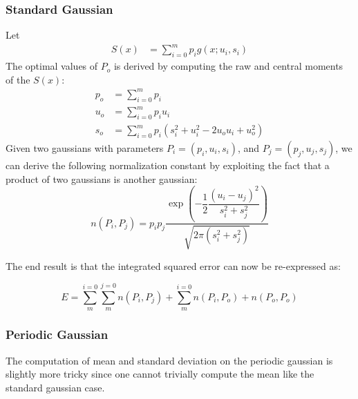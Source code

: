 \documentclass{acm_proc_article-sp}
\begin{document}
\subsubsection{Standard Gaussian}

Let
\begin{align}
S(x) &= \sum\limits^{m}_{i=0} p_i g(x; u_i, s_i)
\end{align}
The optimal values of $P_o$ is derived by computing the raw and central moments of the $S(x)$:
\begin{align*}
p_o &= \sum \limits^{m}_{i=0} p_i \\
u_o &= \sum \limits^{m}_{i=0} p_i u_i \\
s_o &= \sum \limits^{m}_{i=0} p_i (s_i^2+u_i^2-2 u_o u_i + u_o^2)
\end{align*}
Given two gaussians with parameters $P_i = (p_i, u_i, s_i)$, and $P_j = (p_j, u_j, s_j)$, we can derive the following normalization constant by exploiting the fact that a product of two gaussians is another gaussian:
\begin{equation}
n(P_i,P_j) = p_i p_j \dfrac{\exp\left(-\dfrac{1}{2} \dfrac{(u_i-u_j)^2}{s_i^2+s_j^2}\right)}{\sqrt{2\pi (s_i^2+s_j^2)}}
\end{equation}

The end result is that the integrated squared error can now be re-expressed as:

\begin{equation}
E = \sum \limits^{i=0}_{m} \sum \limits^{j=0}_{m} n(P_i, P_j) + \sum \limits^{i=0}_{m} n(P_i, P_o) +n(P_o, P_o)
\end{equation}

\subsubsection{Periodic Gaussian}

The computation of mean and standard deviation on the periodic gaussian is slightly more tricky since one cannot trivially compute the mean like the standard gaussian case. 
\end{document}
